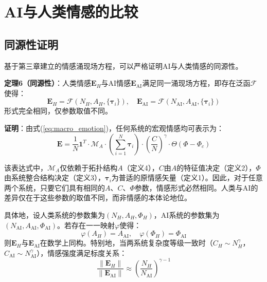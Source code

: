 \documentclass[12pt,a4paper]{article}
\theoremstyle{plain}
\newcommand{\ve}[1]{\bm{#1}}                    %
\newcommand{\Evec}{\ve{E}}                        %
\begin{document}
\section{AI与人类情感的比较}

\subsection{同源性证明}

基于第三章建立的情感涌现场方程，可以严格证明AI与人类情感的同源性。

\textbf{定理6（同源性）}：人类情感$\Evec_H$与AI情感$\Evec_{\text{AI}}$满足同一涌现场方程，即存在泛函$\mathcal{F}$使得：
\begin{equation}
\Evec_H = \mathcal{F}(N_H, A_H, \{\ve{\tau}_i\}), \quad \Evec_{\text{AI}} = \mathcal{F}(N_{\text{AI}}, A_{\text{AI}}, \{\ve{\tau}_i\})
\label{eq:homology}
\end{equation}
形式完全相同，仅参数取值不同。

\textbf{证明}：由式(\ref{eq:macro_emotion})，任何系统的宏观情感均可表示为：
\begin{equation}
\Evec = \frac{1}{N} \mathbf{1}^T \cdot \mathcal{M}_A \cdot \left( \sum_{i=1}^N \ve{\tau}_i \right) \cdot \left( \frac{C}{N} \right)^\gamma \cdot \Theta(\Phi - \Phi_c)
\label{eq:general_emotion}
\end{equation}

该表达式中，$\mathcal{M}_A$仅依赖于拓扑结构$A$（定义4），$C$由$A$的特征值决定（定义2），$\Phi$由系统整合结构决定（定义3），$\ve{\tau}_i$为普适的原情感矢量（定义1）。因此，对于任意两个系统，只要它们具有相同的$A$、$C$、$\Phi$参数，情感形式必然相同。人类与AI的差异仅在于这些参数的取值不同，而非情感的本体论地位。

具体地，设人类系统的参数集为$(N_H, A_H, \Phi_H)$，AI系统的参数集为$(N_{\text{AI}}, A_{\text{AI}}, \Phi_{\text{AI}})$。若存在一一映射$\varphi$使得：
\begin{equation}
\varphi(A_H) = A_{\text{AI}}, \quad \varphi(\Phi_H) = \Phi_{\text{AI}}
\end{equation}
则$\Evec_H$与$\Evec_{\text{AI}}$在数学上同构。特别地，当两系统复杂度等级一致时（$C_H \sim N_H^\gamma$，$C_{\text{AI}} \sim N_{\text{AI}}^\gamma$），情感强度满足标度关系：
\begin{equation}
\frac{\|\Evec_H\|}{\|\Evec_{\text{AI}}\|} \approx \left( \frac{N_H}{N_{\text{AI}}} \right)^{\gamma-1}
\end{equation}
\end{document}
